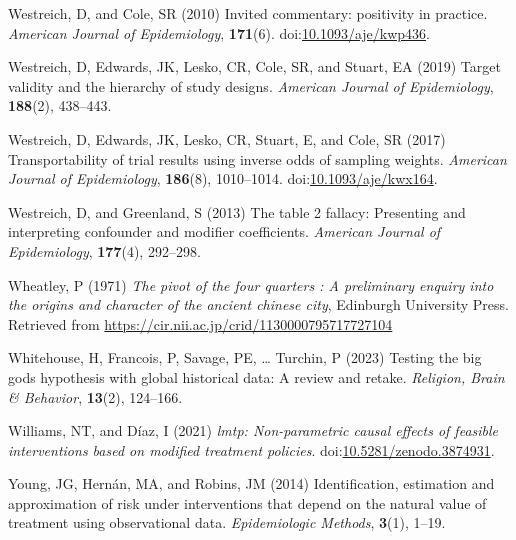 \documentclass[
  single column]{article}
\newlength{\cslhangindent}
\newenvironment{CSLReferences}[2] %
 {\begin{list}{}{%
  \setlength{\itemindent}{0pt}
  \setlength{\leftmargin}{0pt}
  \setlength{\parsep}{0pt}
  \ifodd #1
   \setlength{\leftmargin}{\cslhangindent}
   \setlength{\itemindent}{-1\cslhangindent}
  \fi
  \setlength{\itemsep}{#2\baselineskip}}}
 {\end{list}}
\begin{document}
\begin{CSLReferences}{1}{0}
Westreich, D, and Cole, SR (2010) Invited commentary: positivity in
practice. \emph{American Journal of Epidemiology}, \textbf{171}(6).
doi:\href{https://doi.org/10.1093/aje/kwp436}{10.1093/aje/kwp436}.

Westreich, D, Edwards, JK, Lesko, CR, Cole, SR, and Stuart, EA (2019)
Target validity and the hierarchy of study designs. \emph{American
Journal of Epidemiology}, \textbf{188}(2), 438--443.

Westreich, D, Edwards, JK, Lesko, CR, Stuart, E, and Cole, SR (2017)
Transportability of trial results using inverse odds of sampling
weights. \emph{American Journal of Epidemiology}, \textbf{186}(8),
1010--1014.
doi:\href{https://doi.org/10.1093/aje/kwx164}{10.1093/aje/kwx164}.

Westreich, D, and Greenland, S (2013) The table 2 fallacy: Presenting
and interpreting confounder and modifier coefficients. \emph{American
Journal of Epidemiology}, \textbf{177}(4), 292--298.

Wheatley, P (1971) \emph{The pivot of the four quarters : A preliminary
enquiry into the origins and character of the ancient chinese city},
Edinburgh University Press. Retrieved from
\url{https://cir.nii.ac.jp/crid/1130000795717727104}

Whitehouse, H, Francois, P, Savage, PE, \ldots{} Turchin, P (2023)
Testing the big gods hypothesis with global historical data: A review
and retake. \emph{Religion, Brain \& Behavior}, \textbf{13}(2),
124--166.

Williams, NT, and Díaz, I (2021) \emph{{l}mtp: Non-parametric causal
effects of feasible interventions based on modified treatment policies}.
doi:\href{https://doi.org/10.5281/zenodo.3874931}{10.5281/zenodo.3874931}.

Young, JG, Hernán, MA, and Robins, JM (2014) Identification, estimation
and approximation of risk under interventions that depend on the natural
value of treatment using observational data. \emph{Epidemiologic
Methods}, \textbf{3}(1), 1--19.

\end{CSLReferences}
\end{document}
